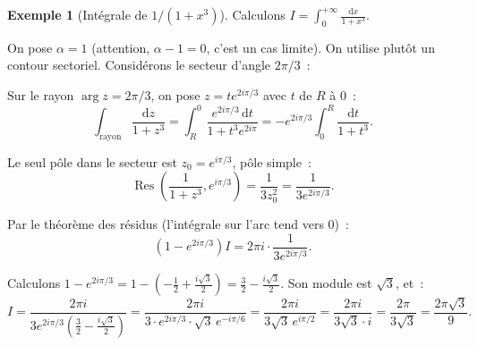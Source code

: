 \documentclass[12pt,a4paper,openany]{book}
\theoremstyle{definition}
\newtheorem{exemple}[definition]{Exemple}
\theoremstyle{plain}
\theoremstyle{remark}
\DeclareMathOperator{\re}{Re}
\DeclareMathOperator{\im}{Im}
\DeclareMathOperator{\Res}{Res}
\newcommand{\dd}{\mathrm{d}}
\begin{document}
\begin{exemple}[Intégrale de $1/(1+x^3)$]\label{ex:int-mellin-1}
Calculons $\displaystyle I = \int_0^{+\infty} \frac{\dd x}{1 + x^3}$.

On pose $\alpha = 1$ (attention, $\alpha - 1 = 0$, c'est un cas limite).
On utilise plutôt un contour sectoriel. Considérons le secteur d'angle $2\pi/3$~:

\begin{center}
\end{center}

Sur le rayon $\arg z = 2\pi/3$, on pose $z = te^{2i\pi/3}$ avec $t$ de $R$ à $0$~:
\[
  \int_{\text{rayon}} \frac{\dd z}{1+z^3}
  = \int_R^0 \frac{e^{2i\pi/3}\,\dd t}{1+t^3 e^{2i\pi}} = -e^{2i\pi/3} \int_0^R \frac{\dd t}{1+t^3}.
\]

Le seul pôle dans le secteur est $z_0 = e^{i\pi/3}$, pôle simple~:
\[
  \Res\!\left(\frac{1}{1+z^3}, e^{i\pi/3}\right)
  = \frac{1}{3z_0^2} = \frac{1}{3e^{2i\pi/3}}.
\]

Par le théorème des résidus (l'intégrale sur l'arc tend vers $0$)~:
\[
  (1 - e^{2i\pi/3}) I = 2\pi i \cdot \frac{1}{3e^{2i\pi/3}}.
\]

Calculons $1 - e^{2i\pi/3} = 1 - \left(-\frac{1}{2} + \frac{i\sqrt{3}}{2}\right)
= \frac{3}{2} - \frac{i\sqrt{3}}{2}$. Son module est $\sqrt{3}$, et~:
\[
  I = \frac{2\pi i}{3e^{2i\pi/3}\left(\frac{3}{2} - \frac{i\sqrt{3}}{2}\right)}
  = \frac{2\pi i}{3 \cdot e^{2i\pi/3} \cdot \sqrt{3}\, e^{-i\pi/6}}
  = \frac{2\pi i}{3\sqrt{3}\, e^{i\pi/2}}
  = \frac{2\pi i}{3\sqrt{3} \cdot i}
  = \frac{2\pi}{3\sqrt{3}} = \frac{2\pi\sqrt{3}}{9}.
\]
\end{exemple}
\end{document}
